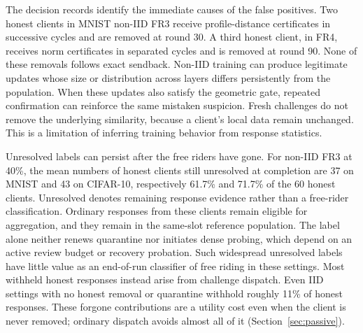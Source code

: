 \documentclass[journal]{IEEEtran}
\begin{document}
The decision records identify the immediate causes of the false positives.
Two honest clients in MNIST non-IID FR3 receive profile-distance
certificates in successive cycles and are removed at round 30. A third
honest client, in FR4, receives norm certificates in separated cycles
and is removed at round 90. None of these removals follows exact sendback.
Non-IID training can produce legitimate updates whose size or distribution
across layers differs persistently from the population. When these updates
also satisfy the geometric gate, repeated confirmation can reinforce the
same mistaken suspicion. Fresh challenges do not remove the underlying
similarity, because a client's local data remain unchanged. This is a
limitation of inferring training behavior from response statistics.

Unresolved labels can persist after the free riders have gone.
For non-IID FR3 at 40\%, the mean numbers of honest clients still
unresolved at completion are 37 on MNIST and 43 on CIFAR-10, respectively
61.7\% and 71.7\% of the 60 honest clients. Unresolved denotes remaining
response evidence rather than a free-rider classification.
Ordinary responses from these clients remain
eligible for aggregation, and they remain in the same-slot reference
population. The label alone neither renews quarantine nor initiates dense
probing, which depend on an active review budget or recovery probation.
Such widespread unresolved labels have little value as an end-of-run
classifier of free riding in these settings.
Most withheld honest responses instead arise from challenge dispatch.
Even IID settings with no honest removal or quarantine withhold roughly
11\% of honest responses. These forgone contributions are a utility cost
even when the client is never removed; ordinary dispatch avoids almost
all of it (Section~\ref{sec:passive}).
\end{document}
